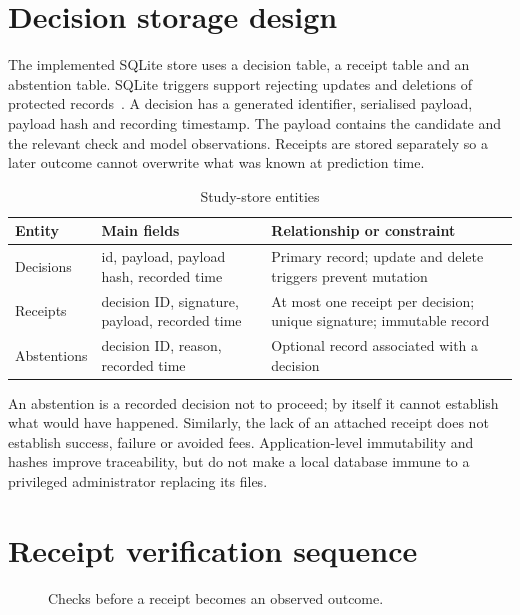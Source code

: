 \documentclass[12pt,a4paper,oneside]{report}
\begin{document}
\section{Decision storage design}
The implemented SQLite store uses a decision table, a receipt table and an abstention table. SQLite triggers support rejecting updates and deletions of protected records~\cite{sqlite}. A decision has a generated identifier, serialised payload, payload hash and recording timestamp. The payload contains the candidate and the relevant check and model observations. Receipts are stored separately so a later outcome cannot overwrite what was known at prediction time.
\begin{table}[htbp]\centering\caption{Study-store entities}
\small\begin{tabularx}{\textwidth}{p{25mm}YY}\toprule Entity&Main fields&Relationship or constraint\\\midrule
Decisions&id, payload, payload hash, recorded time&Primary record; update and delete triggers prevent mutation\\
Receipts&decision ID, signature, payload, recorded time&At most one receipt per decision; unique signature; immutable record\\
Abstentions&decision ID, reason, recorded time&Optional record associated with a decision\\\bottomrule\end{tabularx}\end{table}
An abstention is a recorded decision not to proceed; by itself it cannot establish what would have happened. Similarly, the lack of an attached receipt does not establish success, failure or avoided fees. Application-level immutability and hashes improve traceability, but do not make a local database immune to a privileged administrator replacing its files.
\section{Receipt verification sequence}
\begin{figure}[htbp]\centering
{}\caption{Checks before a receipt becomes an observed outcome.}\end{figure}
\end{document}
